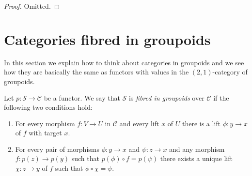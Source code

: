 \begin{proof}
Omitted.
\end{proof}





\section{Categories fibred in groupoids}
\label{section-fibred-groupoids}

\noindent
In this section we explain how to think about categories in groupoids
and we see how they are basically the same as functors with
values in the $(2, 1)$-category of groupoids.

\begin{definition}
\label{definition-fibred-groupoids}
Let $p : \mathcal{S} \to \mathcal{C}$ be a functor.
We say that $\mathcal{S}$ is {\it fibred in groupoids} over $\mathcal{C}$ if
the following two conditions hold:
\begin{enumerate}
\item For every morphism $f : V \to U$ in $\mathcal{C}$ and every
lift $x$ of $U$ there is a lift $\phi : y \to x$ of $f$ with
target $x$.
\item For every pair of morphisms $\phi : y \to x$ and $ \psi : z \to x$
and any morphism $f : p(z) \to p(y)$ such that $p(\phi) \circ f = p(\psi)$
there exists a unique lift $\chi : z \to y$ of $f$ such that
$\phi \circ \chi = \psi$.
\end{enumerate}
\end{definition}

